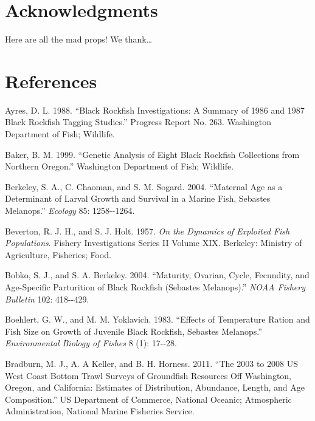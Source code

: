 \documentclass[11pt,
  english,
  letterpaper,
]{article}
\newlength{\cslhangindent}
\newenvironment{CSLReferences}[2] %
 {%
  \setlength{\parindent}{0pt}
  \ifodd #1 \everypar{\setlength{\hangindent}{\cslhangindent}}\ignorespaces\fi
  \ifnum #2 > 0
  \setlength{\parskip}{#2\baselineskip}
  \fi
 }%
 {}
\begin{document}
\hypertarget{acknowledgments}{%
\section{Acknowledgments}\label{acknowledgments}}

Here are all the mad props! We thank\ldots{}

\clearpage

\hypertarget{references}{%
\section{References}\label{references}}

\hypertarget{refs}{}
\begin{CSLReferences}{1}{0}
\leavevmode{}%
Ayres, D. L. 1988. {``Black Rockfish Investigations: A Summary of 1986 and 1987 Black Rockfish Tagging Studies.''} Progress Report No. 263. Washington Department of Fish; Wildlife.

\leavevmode{}%
Baker, B. M. 1999. {``Genetic Analysis of Eight Black Rockfish Collections from Northern Oregon.''} Washington Department of Fish; Wildlife.

\leavevmode{}%
Berkeley, S. A., C. Chaoman, and S. M. Sogard. 2004. {``Maternal Age as a Determinant of Larval Growth and Survival in a Marine Fish, Sebastes Melanops.''} \emph{Ecology} 85: 1258-\/-1264.

\leavevmode{}%
Beverton, R. J. H., and S. J. Holt. 1957. \emph{On the Dynamics of Exploited Fish Populations}. Fishery {Investigations} {Series II} {Volume XIX}. Berkeley: Ministry of Agriculture, Fisheries; Food.

\leavevmode{}%
Bobko, S. J., and S. A. Berkeley. 2004. {``Maturity, Ovarian, Cycle, Fecundity, and Age-Specific Parturition of Black Rockfish (Sebastes Melanops).''} \emph{NOAA Fishery Bulletin} 102: 418-\/-429.

\leavevmode{}%
Boehlert, G. W., and M. M. Yoklavich. 1983. {``Effects of Temperature Ration and Fish Size on Growth of Juvenile Black Rockfish, Sebastes Melanops.''} \emph{Environmental Biology of Fishes} 8 (1): 17-\/-28.

\leavevmode{}%
Bradburn, M. J., A. A Keller, and B. H. Horness. 2011. {``The 2003 to 2008 {US} {West} {Coast} Bottom Trawl Surveys of Groundfish Resources Off {Washington}, {Oregon}, and {California}: Estimates of Distribution, Abundance, Length, and Age Composition.''} US Department of Commerce, National Oceanic; Atmospheric Administration, National Marine Fisheries Service.


\end{CSLReferences}
\end{document}
